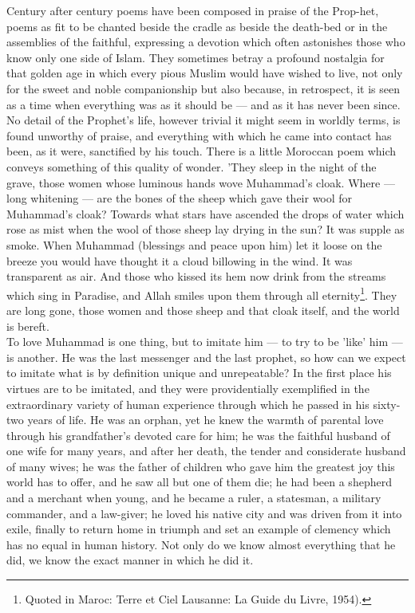\documentclass[11pt, b5paper, twoside]{book}
\begin{document}
Century after century poems have been composed in praise of the Prop\hyp{}het, poems as fit to be chanted 
beside the cradle as beside the death-bed or in the assemblies of the faithful, expressing a devotion 
which often astonishes those who know only one side of Islam. They sometimes betray a profound 
nostalgia for that golden age in which every pious Muslim would have wished to live, not only for the 
sweet and noble companionship but also because, in retrospect, it is seen as a time when everything 
was as it should be --- and as it has never been since. No detail of the Prophet's life, however 
trivial it might seem in worldly terms, is found unworthy of praise, and everything with which he 
came into contact has been, as it were, sanctified by his touch. There is a little Moroccan poem 
which conveys something of this quality of wonder. 'They sleep in the night of the grave, those women 
whose luminous hands wove Muhammad's cloak. Where --- long whitening --- are the bones of the sheep which gave their wool for Muhammad's cloak? Towards what stars have ascended the drops of water which rose as mist when the wool of those sheep lay drying in the sun? It was supple as smoke. When Muhammad (blessings and peace upon him) let it loose on the breeze you would have thought it a cloud billowing in the wind. It was transparent as air. And those who kissed its hem now drink from the streams which sing in Paradise, and Allah smiles upon them through all eternity\footnote{Quoted in Maroc: Terre et Ciel Lausanne: La Guide du Livre, 1954).}. They are long gone, those women and those sheep and that cloak itself, and the world is bereft. \\

To love Muhammad is one thing, but to imitate him --- to try to be 'like' him --- is another. He was the 
last messenger and the last prophet, so how can we expect to imitate what is by definition unique and 
unrepeatable? In the first place his virtues are to be imitated, and they were providentially 
exemplified in the extraordinary variety of human experience through which he passed in his sixty-two 
years of life. He was an orphan, yet he knew the warmth of parental love through his grandfather's 
devoted care for him; he was the faithful husband of one wife for many years, and after her death, 
the tender and considerate husband of many wives; he was the father of children who gave him the 
greatest joy this world has to offer, and he saw all but one of them die; he had been a shepherd and 
a merchant when young, and he became a ruler, a statesman, a military commander, and a law-giver; he 
loved his native city and was driven from it into exile, finally to return home in triumph and set an 
example of clemency which has no equal in human history. Not only do we know almost everything that 
he did, we know the exact manner in which he did it. \\
\end{document}
